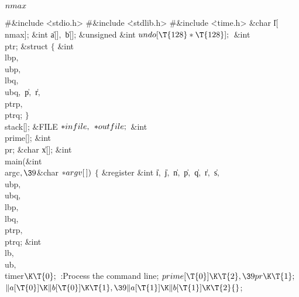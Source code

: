 \Y\B\4\D$\\{nmax}$ \5
\par
\Y\B\8\#\&{include} \.{<stdio.h>}\6
\8\#\&{include} \.{<stdlib.h>}\6
\8\#\&{include} \.{<time.h>}\6
\&{char} \|l[\\{nmax}];\6
\&{int} \|a[]${},{}$ \|b[];\6
\&{unsigned} \&{int} ${}\\{undo}[\T{128}*\T{128}];{}$\6
\&{int} \\{ptr};\6
\&{struct} ${}\{{}$\1\6
\&{int} \\{lbp}${},{}$ \\{ubp}${},{}$ \\{lbq}${},{}$ \\{ubq}${},{}$ \|p${},{}$ %
\|r${},{}$ \\{ptrp}${},{}$ \\{ptrq};\2\6
${}\}{}$ \\{stack}[];\6
\&{FILE} ${}{*}\\{infile},{}$ ${}{*}\\{outfile};{}$\6
\&{int} \\{prime}[];\6
\&{int} \\{pr};\6
\&{char} \|x[];\7
\&{int} \\{main}(\&{int} \\{argc}${},\39{}$\&{char} ${}{*}\\{argv}[\,]){}$\1\1%
\2\2\6
${}\{{}$\1\6
\&{register} \&{int} \|i${},{}$ \|j${},{}$ \|n${},{}$ \|p${},{}$ \|q${},{}$ %
\|r${},{}$ \|s${},{}$ \\{ubp}${},{}$ \\{ubq}${},{}$ \\{lbp}${},{}$ %
\\{lbq}${},{}$ \\{ptrp}${},{}$ \\{ptrq};\6
\&{int} \\{lb}${},{}$ \\{ub}${},{}$ \\{timer}${}\K\T{0};{}$\7
:Process the command line\X;\6
${}\\{prime}[\T{0}]\K\T{2},\39\\{pr}\K\T{1};{}$\6
${}\|a[\T{0}]\K\|b[\T{0}]\K\T{1},\39\|a[\T{1}]\K\|b[\T{1}]\K\T{2}{}$;\6
